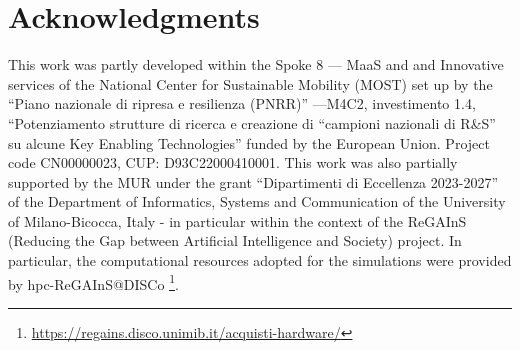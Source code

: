 \chapter*{Acknowledgments}

 This work was partly developed within the Spoke 8 — MaaS and and Innovative services of the National Center for Sustainable Mobility (MOST) set up by the “Piano nazionale di ripresa e resilienza (PNRR)” —M4C2, investimento 1.4, “Potenziamento strutture di ricerca e creazione di “campioni nazionali di R\&S” su alcune Key Enabling Technologies” funded by the European Union. Project code CN00000023, CUP: D93C22000410001. This work was also partially supported by the MUR under the grant “Dipartimenti di Eccellenza 2023-2027” of the Department of Informatics, Systems and Communication of the University of Milano-Bicocca, Italy - in particular within the context of the ReGAInS (Reducing the Gap between Artificial Intelligence and Society) project. In particular, the  computational resources adopted for the simulations were provided by hpc-ReGAInS@DISCo \footnote{\href{https://regains.disco.unimib.it/acquisti-hardware/}{https://regains.disco.unimib.it/acquisti-hardware/}}.
